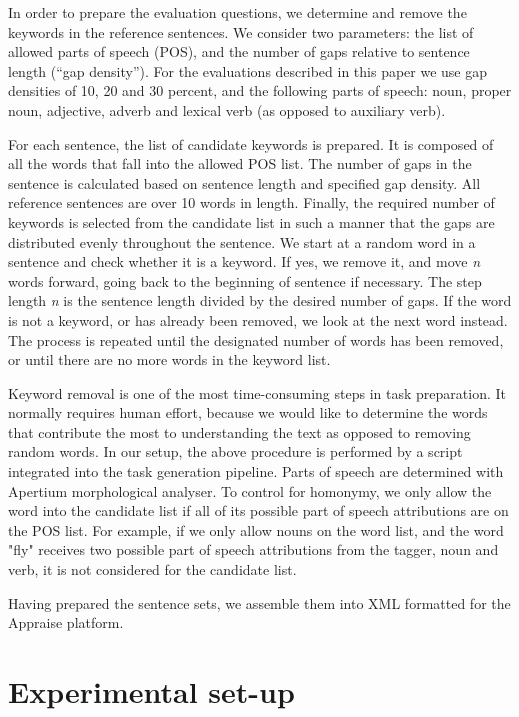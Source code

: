 \documentclass[11pt]{article}
\begin{document}
In order to prepare the evaluation questions, we determine and remove the keywords in the 
reference sentences. We consider two parameters: the list of allowed parts of speech (POS), and the 
number of gaps relative to sentence length (``gap density''). For the evaluations described in 
this paper we use gap densities of 10, 20 and 30 percent, and the following parts of speech: noun, 
proper noun, adjective, adverb and lexical verb (as opposed to auxiliary verb).

For each sentence, the list of candidate keywords is prepared. It is composed of all the words that 
fall into the allowed POS list. The number of gaps in the sentence is calculated based on 
sentence length and specified gap density. All reference sentences are over 10 words in length. Finally, the required number of keywords is selected 
from the candidate list in such a manner that the gaps are distributed evenly throughout the sentence. We start at a random word in a sentence and check whether it is a keyword. If yes, we remove it, and move \emph{n} words forward, going back to the beginning of sentence if necessary. The step length \emph{n} is the sentence length divided by the desired number of gaps. If the word is not a keyword, or has already been removed, we look at the next word instead. The process is repeated until the designated number of words has been removed, or until there are no more words in the keyword list.

Keyword removal is one of the most time-consuming steps in task preparation. It normally requires human effort, because we would like to determine the words that contribute the most to understanding the text as opposed to removing random words. In our setup, the above procedure is performed by a script integrated into the task generation pipeline. Parts of speech are determined with Apertium morphological analyser. To control for homonymy, we only allow the word into the candidate list if all of its possible part of speech attributions are on the POS list. For example, if we only allow nouns on the word list, and the word "fly" receives two possible part of speech attributions from the tagger, noun and verb, it is not considered for the candidate list.

Having prepared the sentence sets, we assemble them into XML formatted for the Appraise platform.

\section{Experimental set-up}
\label{sec:setup}
\end{document}
